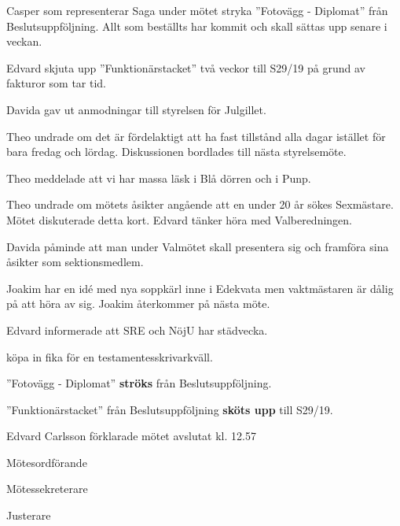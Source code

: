 \documentclass[10pt]{article}
\def\mo{Edvard Carlsson}
\def\ms{Mattias Lundström}
\def\ji{Lina Samnegård}
\begin{document}
\begin{paragrafer}

Casper som representerar Saga under mötet \ypa stryka ''Fotovägg - Diplomat'' från Beslutsuppföljning. Allt som beställts har kommit och skall sättas upp senare i veckan. 

\Mbaby

Edvard \ypa skjuta upp ''Funktionärstacket'' två veckor till S29/19 på grund av fakturor som tar tid. 

\Mbaby

Davida gav ut anmodningar till styrelsen för Julgillet.  

Theo undrade om det är fördelaktigt att ha fast tillstånd alla dagar istället för bara fredag och lördag. Diskussionen bordlades till nästa styrelsemöte. 

Theo meddelade att vi har massa läsk i Blå dörren och i Punp. 

Theo undrade om mötets åsikter angående att en under 20 år sökes Sexmästare. Mötet diskuterade detta kort. Edvard tänker höra med Valberedningen. 


Davida påminde att man under Valmötet skall presentera sig och framföra sina åsikter som sektionsmedlem. 

Joakim har en idé med nya soppkärl inne i Edekvata men vaktmästaren är dålig på att höra av sig. Joakim återkommer på nästa möte. 

Edvard informerade att SRE och NöjU har städvecka. 

\Mba köpa in fika för en testamentesskrivarkväll. 

''Fotovägg - Diplomat'' \textbf{ströks} från Beslutsuppföljning.

''Funktionärstacket'' från Beslutsuppföljning \textbf{sköts upp} till S29/19.



{\mo} förklarade mötet avslutat kl. 12.57
\end{paragrafer}

\hidesignfoot
\begin{signatures}{3}
\signature{\mo}{Mötesordförande}
\signature{\ms}{Mötessekreterare}
\signature{\ji}{Justerare}
\end{signatures}
\end{document}
